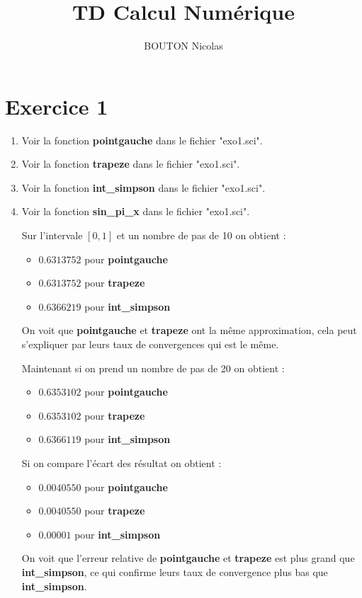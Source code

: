\documentclass[12pt, letterpaper]{article}
\title{TD Calcul Numérique}
\author{BOUTON Nicolas}
\begin{document}
\maketitle

\section*{Exercice 1}

\begin{enumerate}
\item Voir la fonction \textbf{pointgauche} dans le fichier "exo1.sci".
\item Voir la fonction \textbf{trapeze} dans le fichier "exo1.sci".
\item Voir la fonction \textbf{int\_simpson} dans le fichier "exo1.sci".
\item Voir la fonction \textbf{sin\_pi\_x} dans le fichier
  "exo1.sci".\newline 

  Sur l'intervale $[0, 1]$ et un nombre de pas de 10  on obtient :
  \begin{itemize}
  \item $ 0.6313752 $ pour \textbf{pointgauche}
  \item $ 0.6313752 $ pour \textbf{trapeze}
  \item $ 0.6366219 $ pour \textbf{int\_simpson}
  \end{itemize}

  On voit que \textbf{pointgauche} et \textbf{trapeze} ont la même
  approximation, cela peut s'expliquer par leurs taux de convergences
  qui est le même.\newline

  Maintenant si on prend un nombre de pas de 20 on obtient :
    \begin{itemize}
    \item $ 0.6353102 $ pour \textbf{pointgauche}
    \item $ 0.6353102 $ pour \textbf{trapeze}
    \item $ 0.6366119 $ pour \textbf{int\_simpson}
    \end{itemize}

    Si on compare l'écart des résultat on obtient :
    \begin{itemize}
    \item $ 0.0040550 $ pour \textbf{pointgauche}
    \item $ 0.0040550 $ pour \textbf{trapeze}
    \item $ 0.00001 $ pour \textbf{int\_simpson}
    \end{itemize}

    On voit que l'erreur relative de \textbf{pointgauche} et \textbf{trapeze}
    est plus grand que \textbf{int\_simpson}, ce qui confirme leurs
    taux de convergence plus bas que \textbf{int\_simpson}.
        
\end{enumerate}
\end{document}
